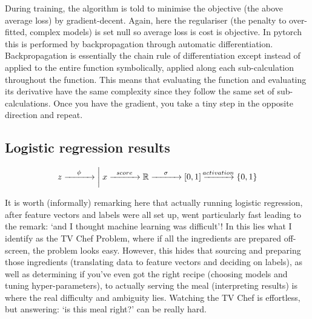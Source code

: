 \documentclass[12pt,a4paper]{article}
\begin{document}
During training, the algorithm is told to minimise the objective (the above average loss) by gradient-decent. Again, here the regulariser (the penalty to over-fitted, complex models) is set null so average loss is cost is objective. In pytorch \citep{torch} this is performed by backpropagation through automatic differentiation. Backpropagation is essentially the chain rule of differentiation except instead of applied to the entire function symbolically, applied along each sub-calculation throughout the function. This means that evaluating the function and evaluating its derivative have the same complexity since they follow the same set of sub-calculations. Once you have the gradient, you take a tiny step in the opposite direction and repeat.

\newpage
\subsection{Logistic regression results}



{\large
\begin{equation}
    \label{eq:predictionprocess}
    z \xrightarrow{\mathmakebox[3em]{\phi}} \bigg\rvert \; x \xrightarrow{\mathmakebox[3em]{score}} \mathbb{R} \xrightarrow{\mathmakebox[3em]{\sigma}} [0,1] \xrightarrow{\mathmakebox[3em]{activation}} \{0,1\}
\end{equation}}

It is worth (informally) remarking here that actually running logistic regression, after feature vectors and labels were all set up, went particularly fast leading to the remark: `and I thought machine learning was difficult'! In this lies what I identify as the TV Chef Problem, where if all the ingredients are prepared off-screen, the problem looks easy. However, this hides that sourcing and preparing those ingredients (translating data to feature vectors and deciding on labels), as well as determining if you've even got the right recipe (choosing models and tuning hyper-parameters), to actually serving the meal (interpreting results) is where the real difficulty and ambiguity lies. Watching the TV Chef is effortless, but answering: `is this meal right?' can be really hard.
\end{document}
